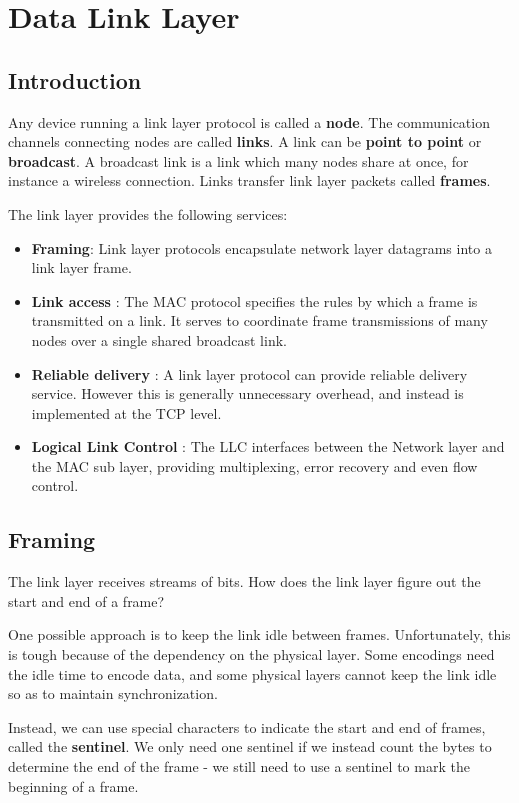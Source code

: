 \documentclass[12pt,letterpaper]{book}
\theoremstyle{definition}
\begin{document}
\chapter{Data Link Layer}

\section{Introduction}

Any device running a link layer protocol is called a \textbf{node}. The communication channels connecting nodes are called \textbf{links}. A link can be \textbf{point to point} or \textbf{broadcast}. A broadcast link is a link which many nodes share at once, for instance a wireless connection. Links transfer link layer packets called \textbf{frames}.

The link layer provides the following services:
\begin{itemize}
  \item \textbf{Framing}: Link layer protocols encapsulate network layer datagrams into a link layer frame.
  \item \textbf{Link access} : The MAC protocol specifies the rules by which a frame is transmitted on a link. It serves to coordinate frame transmissions of many nodes over a single shared broadcast link.
  \item \textbf{Reliable delivery} : A link layer protocol can provide reliable delivery service. However this is generally unnecessary overhead, and instead is implemented at the TCP level.
  \item  \textbf{Logical Link Control} : The LLC interfaces between the Network layer and the MAC sub layer, providing multiplexing, error recovery and even flow control.
\end{itemize}

\section{Framing}

The link layer receives streams of bits. How does the link layer figure out the start and end of a frame?

One possible approach is to keep the link idle between frames. Unfortunately, this is tough because of the dependency on the physical layer. Some encodings need the idle time to encode data, and some physical layers cannot keep the link idle so as to maintain synchronization.

Instead, we can use special characters to indicate the start and end of frames, called the \textbf{sentinel}. We only need one sentinel if we instead count the bytes to determine the end of the frame - we still need to use a sentinel to mark the beginning of a frame.
\end{document}
